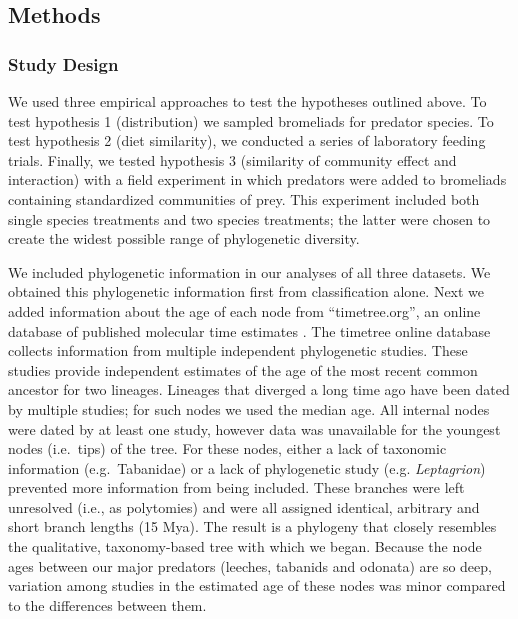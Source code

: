 \subsection{Methods}\label{methods}

\subsubsection{Study Design}\label{study-design}

We used three empirical approaches to test the hypotheses outlined
above. To test hypothesis 1 (distribution) we sampled bromeliads for
predator species. To test hypothesis 2 (diet similarity), we conducted a
series of laboratory feeding trials. Finally, we tested hypothesis 3
(similarity of community effect and interaction) with a field experiment
in which predators were added to bromeliads containing standardized
communities of prey. This experiment included both single species
treatments and two species treatments; the latter were chosen to create
the widest possible range of phylogenetic diversity.

We included phylogenetic information in our analyses of all three
datasets. We obtained this phylogenetic information first from
classification alone. Next we added information about the age of each
node from ``timetree.org'', an online database of published molecular
time estimates \citep{Hedges2006}. The timetree online database collects
information from multiple independent phylogenetic studies. These
studies provide independent estimates of the age of the most recent
common ancestor for two lineages. Lineages that diverged a long time ago
have been dated by multiple studies; for such nodes we used the median
age. All internal nodes were dated by at least one study, however data
was unavailable for the youngest nodes (i.e.~tips) of the tree. For
these nodes, either a lack of taxonomic information (e.g.~Tabanidae) or
a lack of phylogenetic study (e.g. \emph{Leptagrion}) prevented more
information from being included. These branches were left unresolved
(i.e., as polytomies) and were all assigned identical, arbitrary and
short branch lengths (15 Mya). The result is a phylogeny that closely
resembles the qualitative, taxonomy-based tree with which we began.
Because the node ages between our major predators (leeches, tabanids and
odonata) are so deep, variation among studies in the estimated age of
these nodes was minor compared to the differences between them.

